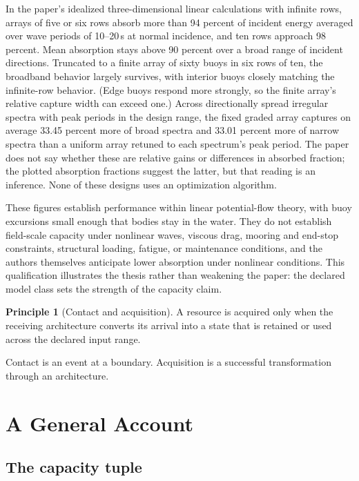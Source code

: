 \documentclass[11pt]{article}
\theoremstyle{definition}
\newtheorem{principle}{Principle}
\begin{document}
In the paper's idealized three-dimensional linear calculations with infinite rows, arrays of five or six rows absorb more than 94 percent of incident energy averaged over wave periods of 10--20\,s at normal incidence, and ten rows approach 98 percent. Mean absorption stays above 90 percent over a broad range of incident directions. Truncated to a finite array of sixty buoys in six rows of ten, the broadband behavior largely survives, with interior buoys closely matching the infinite-row behavior. (Edge buoys respond more strongly, so the finite array's relative capture width can exceed one.) Across directionally spread irregular spectra with peak periods in the design range, the fixed graded array captures on average 33.45 percent more of broad spectra and 33.01 percent more of narrow spectra than a uniform array retuned to each spectrum's peak period. The paper does not say whether these are relative gains or differences in absorbed fraction; the plotted absorption fractions suggest the latter, but that reading is an inference. None of these designs uses an optimization algorithm.

These figures establish performance within linear potential-flow theory, with buoy excursions small enough that bodies stay in the water. They do not establish field-scale capacity under nonlinear waves, viscous drag, mooring and end-stop constraints, structural loading, fatigue, or maintenance conditions, and the authors themselves anticipate lower absorption under nonlinear conditions. This qualification illustrates the thesis rather than weakening the paper: the declared model class sets the strength of the capacity claim.

\begin{principle}[Contact and acquisition]
A resource is acquired only when the receiving architecture converts its arrival into a state that is retained or used across the declared input range.
\end{principle}

Contact is an event at a boundary. Acquisition is a successful transformation through an architecture.

\section{A General Account}\label{sec:general}

\subsection{The capacity tuple}
\end{document}
